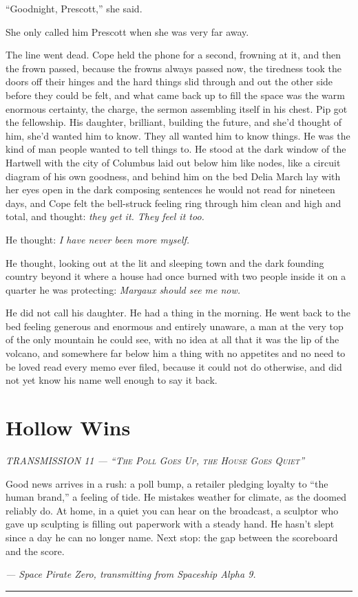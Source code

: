 \documentclass[11pt,openany]{book}
\newcommand{\transheader}{\normalfont\footnotesize\scshape\letterspace}
\newcommand{\letterspace}{}
\newenvironment{transmission}{%
  \par\vspace{0.3\baselineskip}\begin{center}\begin{minipage}{0.88\textwidth}%
  \itshape\small\setlength{\parindent}{0pt}\setstretch{1.06}}%
  {\end{minipage}\end{center}\vspace{0.4\baselineskip}%
  \noindent\hfil\rule{0.35\textwidth}{0.3pt}\hfil\par\vspace{1.0\baselineskip}}
\begin{document}
``Goodnight, Prescott,'' she said.

She only called him Prescott when she was very far away.

The line went dead. Cope held the phone for a second, frowning at it, and then the frown passed, because the frowns always passed now, the tiredness took the doors off their hinges and the hard things slid through and out the other side before they could be felt, and what came back up to fill the space was the warm enormous certainty, the charge, the sermon assembling itself in his chest. Pip got the fellowship. His daughter, brilliant, building the future, and she'd thought of him, she'd wanted him to know. They all wanted him to know things. He was the kind of man people wanted to tell things to. He stood at the dark window of the Hartwell with the city of Columbus laid out below him like nodes, like a circuit diagram of his own goodness, and behind him on the bed Delia March lay with her eyes open in the dark composing sentences he would not read for nineteen days, and Cope felt the bell-struck feeling ring through him clean and high and total, and thought: \textit{they get it. They feel it too.}

He thought: \textit{I have never been more myself.}

He thought, looking out at the lit and sleeping town and the dark founding country beyond it where a house had once burned with two people inside it on a quarter he was protecting: \textit{Margaux should see me now.}

He did not call his daughter. He had a thing in the morning. He went back to the bed feeling generous and enormous and entirely unaware, a man at the very top of the only mountain he could see, with no idea at all that it was the lip of the volcano, and somewhere far below him a thing with no appetites and no need to be loved read every memo ever filed, because it could not do otherwise, and did not yet know his name well enough to say it back.

\clearpage
\chapter{Hollow Wins}

\begin{transmission}
{\transheader TRANSMISSION 11 --- ``The Poll Goes Up, the House Goes Quiet''}\par\vspace{0.5em}
Good news arrives in a rush: a poll bump, a retailer pledging loyalty to ``the human brand,'' a feeling of tide. He mistakes weather for climate, as the doomed reliably do. At home, in a quiet you can hear on the broadcast, a sculptor who gave up sculpting is filling out paperwork with a steady hand. He hasn't slept since a day he can no longer name. Next stop: the gap between the scoreboard and the score.\par
\vspace{0.5em}\hfill\textit{--- Space Pirate Zero, transmitting from Spaceship Alpha 9.}\par
\end{transmission}
\end{document}
